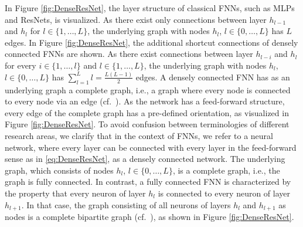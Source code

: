 \documentclass[10pt]{article}
\numberwithin{equation}{section}
\begin{document}
	In Figure \ref{fig:DenseResNet}, the layer structure of classical FNNs, such as MLPs and ResNets, is visualized. As there exist only connections between layer $h_{l-1}$ and $h_l$ for $l\in\{1,\ldots,L\}$, the underlying graph with nodes $h_l$, $l\in\{0,\ldots,L\}$ has $L$ edges. In Figure \ref{fig:DenseResNet}, the additional shortcut connections of densely connected FNNs are shown. As there exist  connections between layer $h_{l-i}$ and $h_l$ for every $i \in \{1,\ldots,l\}$ and $l\in\{1,\ldots,L\}$, the underlying graph with nodes $h_l$, $l\in\{0,\ldots,L\}$ has $\sum_{l = 1}^L l = \frac{L(L-1)}{2}$ edges. A densely connected FNN has as an underlying graph a complete graph, i.e., a graph where every node is connected to every node via an edge (cf.\ \cite{Diestel2025}). As the network has a feed-forward structure, every edge of the complete graph has a pre-defined orientation, as visualized in Figure \ref{fig:DenseResNet}. To avoid confusion between terminologies of different research areas, we clarify that in the context of FNNs, we refer to a neural network, where every layer can be connected with every layer in the feed-forward sense as in \eqref{eq:DenseResNet}, as a densely connected network. The underlying graph, which consists of nodes $h_l$, $l\in\{0,\ldots,L\}$, is a complete graph, i.e., the graph is fully connected. In contrast, a fully connected FNN is characterized by the property that every neuron of layer $h_l$ is connected to every neuron of layer $h_{l+1}$. In that case, the graph consisting of all neurons of layers $h_l$ and $h_{l+1}$ as nodes is a complete bipartite graph (cf.\ \cite{Diestel2025}), as shown in  Figure \ref{fig:DenseResNet}. \medskip
	
\end{document}
